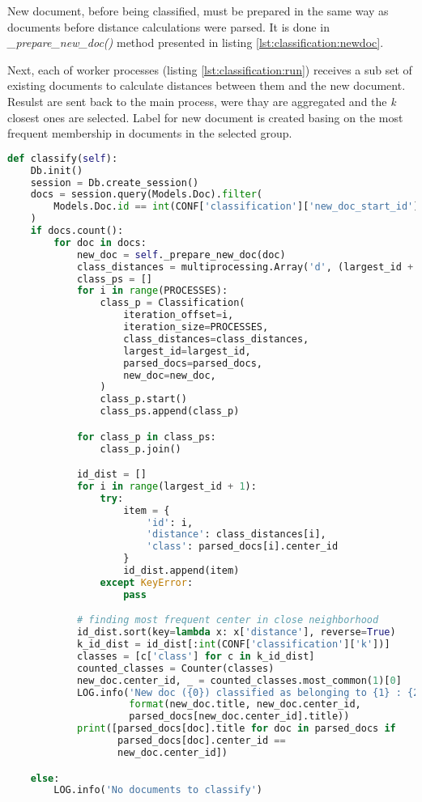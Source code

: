 New document, before being classified, must be prepared in the same way as documents before distance calculations were parsed. It is done in \textit{\_prepare\_new\_doc()} method presented in listing \ref{lst:classification:newdoc}.

Next, each of worker processes (listing \ref{lst:classification:run}) receives a sub set of existing documents to calculate distances between them and the new document. Resulst are sent back to the main process, were thay are aggregated and the \textit{k} closest ones are selected. Label for new document is created basing on the most frequent membership in documents in the selected group.

\begin{lstlisting}[language=Python, caption={Main.classify() - Main process method for conducting kNN classification}, label={lst:main:classify}]
def classify(self):
    Db.init()
    session = Db.create_session()
    docs = session.query(Models.Doc).filter(
        Models.Doc.id == int(CONF['classification']['new_doc_start_id'])
    )
    if docs.count():
        for doc in docs:
            new_doc = self._prepare_new_doc(doc)
            class_distances = multiprocessing.Array('d', (largest_id + 1))
            class_ps = []
            for i in range(PROCESSES):
                class_p = Classification(
                    iteration_offset=i,
                    iteration_size=PROCESSES,
                    class_distances=class_distances,
                    largest_id=largest_id,
                    parsed_docs=parsed_docs,
                    new_doc=new_doc,
                )
                class_p.start()
                class_ps.append(class_p)

            for class_p in class_ps:
                class_p.join()

            id_dist = []
            for i in range(largest_id + 1):
                try:
                    item = {
                        'id': i,
                        'distance': class_distances[i],
                        'class': parsed_docs[i].center_id
                    }
                    id_dist.append(item)
                except KeyError:
                    pass

            # finding most frequent center in close neighborhood
            id_dist.sort(key=lambda x: x['distance'], reverse=True)
            k_id_dist = id_dist[:int(CONF['classification']['k'])]
            classes = [c['class'] for c in k_id_dist]
            counted_classes = Counter(classes)
            new_doc.center_id, _ = counted_classes.most_common(1)[0]
            LOG.info('New doc ({0}) classified as belonging to {1} : {2}'.
                     format(new_doc.title, new_doc.center_id,
                     parsed_docs[new_doc.center_id].title))
            print([parsed_docs[doc].title for doc in parsed_docs if
                   parsed_docs[doc].center_id ==
                   new_doc.center_id])

    else:
        LOG.info('No documents to classify')
\end{lstlisting}

